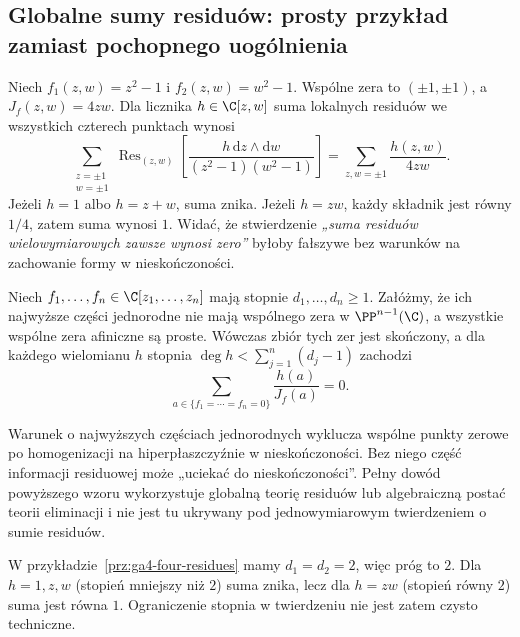 \subsection{Globalne sumy residuów: prosty przykład zamiast pochopnego uogólnienia}
\label{subsec:ga4-global-multi-res}

\begin{przyklad}
\label{prz:ga4-four-residues}
Niech $f_1(z,w)=z^2-1$ i $f_2(z,w)=w^2-1$.
Wspólne zera to $(\pm1,\pm1)$, a $J_f(z,w)=4zw$.
Dla licznika $h\in\C[z,w]$ suma lokalnych residuów
we wszystkich czterech punktach wynosi
\[
\sum_{\substack{z=\pm1\\w=\pm1}}
\operatorname{Res}_{(z,w)}\!\left[
\frac{h\,\mathrm dz\wedge\mathrm dw}{(z^2-1)(w^2-1)}\right]
=\sum_{z,w=\pm1}\frac{h(z,w)}{4zw}.
\]
Jeżeli $h=1$ albo $h=z+w$, suma znika.
Jeżeli $h=zw$, każdy składnik jest równy $1/4$,
zatem suma wynosi $1$.
Widać, że stwierdzenie \emph{„suma residuów wielowymiarowych
zawsze wynosi zero”} byłoby fałszywe bez warunków
na zachowanie formy w nieskończoności.
\end{przyklad}

\begin{twierdzenie}
\label{tw:ga4-euler-jacobi}
Niech $f_1,\ldots,f_n\in\C[z_1,\ldots,z_n]$ mają
stopnie $d_1,\ldots,d_n\ge1$. Załóżmy, że ich
najwyższe części jednorodne nie mają wspólnego zera
w $\PP^{n-1}(\C)$, a wszystkie wspólne zera afiniczne
są proste. Wówczas zbiór tych zer jest skończony,
a dla każdego wielomianu $h$ stopnia
$\deg h<\sum_{j=1}^n(d_j-1)$ zachodzi
\[
\sum_{a\in\{f_1=\cdots=f_n=0\}}\frac{h(a)}{J_f(a)}=0.
\]
\end{twierdzenie}

\begin{uwaga}
Warunek o najwyższych częściach jednorodnych wyklucza
wspólne punkty zerowe po homogenizacji na hiperpłaszczyźnie
w nieskończoności. Bez niego część informacji residuowej
może „uciekać do nieskończoności”. Pełny dowód powyższego
wzoru wykorzystuje globalną teorię residuów lub algebraiczną
postać teorii eliminacji i nie jest tu ukrywany pod
jednowymiarowym twierdzeniem o sumie residuów.
\end{uwaga}

\begin{przyklad}
W przykładzie~\ref{prz:ga4-four-residues} mamy $d_1=d_2=2$,
więc próg to $2$. Dla $h=1,z,w$ (stopień mniejszy niż $2$)
suma znika, lecz dla $h=zw$ (stopień równy $2$)
suma jest równa $1$. Ograniczenie stopnia w twierdzeniu
nie jest zatem czysto techniczne.
\end{przyklad}

